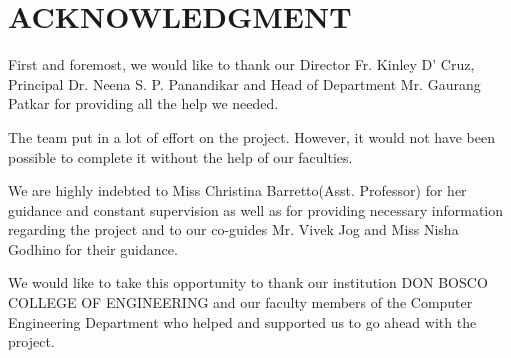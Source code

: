 \chapter*{ACKNOWLEDGMENT}

First and foremost, we would like to thank our Director Fr. Kinley D’ Cruz, Principal Dr. Neena S. P. Panandikar and Head of Department Mr. Gaurang Patkar for providing all the help we needed.

The team put in a lot of effort on the project. However, it would not have been possible to complete it without the help of our faculties.

We are highly indebted to Miss Christina Barretto(Asst. Professor) for her guidance and constant supervision as well as for providing necessary information regarding the project and to our co-guides Mr. Vivek Jog and Miss Nisha Godhino for their guidance.

We would like to take this opportunity to thank our institution DON BOSCO COLLEGE OF ENGINEERING and our faculty members of the Computer Engineering Department who helped and supported us to go ahead with the project.
